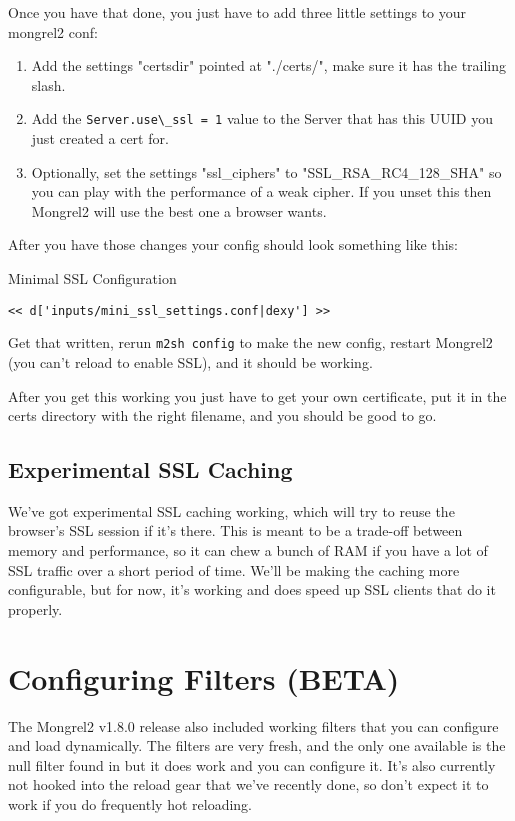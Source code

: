 Once you have that done, you just have to add three little settings to your
mongrel2 conf:

\begin{enumerate}
\item Add the settings "certsdir" pointed at "./certs/", make sure it has the trailing slash.
\item Add the \verb|Server.use\_ssl = 1| value to the Server that has this UUID
    you just created a cert for.
\item Optionally, set the settings "ssl\_ciphers" to "SSL\_RSA\_RC4\_128\_SHA" so you can
    play with the performance of a weak cipher.  If you unset this then Mongrel2 will
    use the best one a browser wants.
\end{enumerate}

After you have those changes your config should look something like this:

\begin{code}{Minimal SSL Configuration}
\begin{lstlisting}
<< d['inputs/mini_ssl_settings.conf|dexy'] >>
\end{lstlisting}
\end{code}

Get that written, rerun \verb|m2sh config| to make the new config, restart
Mongrel2 (you can't reload to enable SSL), and it should be working.

After you get this working you just have to get your own certificate, put it
in the certs directory with the right filename, and you should be good to go.

\subsection{Experimental SSL Caching}

We've got experimental SSL caching working, which will try to reuse the 
browser's SSL session if it's there.  This is meant to be a trade-off between
memory and performance, so it can chew a bunch of RAM if you have a lot of
SSL traffic over a short period of time.  We'll be making the caching more
configurable, but for now, it's working and does speed up SSL clients that
do it properly.


\section{Configuring Filters (BETA)}

The Mongrel2 v1.8.0 release also included working filters that you can 
configure and load dynamically.  The filters are very fresh, and the
only one available is the null filter found in 
but it does work and you can configure it.  It's also currently not
hooked into the reload gear that we've recently done, so don't expect
it to work if you do frequently hot reloading.

